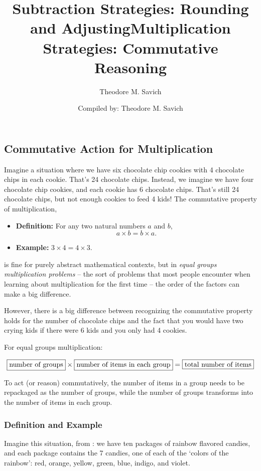 \documentclass[11pt]{article}
\title{Subtraction Strategies: Rounding and Adjusting}
\author{Theodore M. Savich}
\title{Multiplication Strategies: Commutative Reasoning}
\author{Compiled by: Theodore M. Savich}
\begin{document}
\maketitle
\subsection*{Commutative Action for Multiplication}

Imagine a situation where we have six chocolate chip cookies with 4 chocolate chips in each cookie. That's 24 chocolate chips. Instead, we imagine we have four chocolate chip cookies, and each cookie has 6 chocolate chips. That's still 24 chocolate chips, but not enough cookies to feed 4 kids! The commutative property of multiplication,
\begin{itemize}
    \item \textbf{Definition:} For any two natural numbers \( a \) and \( b \), 
    \[
    a \times b = b \times a.
    \]
    \item \textbf{Example:} \( 3 \times 4 = 4 \times 3 \).
\end{itemize}
is fine for purely abstract mathematical contexts, but in \textit{equal groups multiplication problems} -- the sort of problems that most people encounter when learning about multiplication for the first time -- the order of the factors can make a big difference.

However, there is a big difference between recognizing the commutative property holds for the number of chocolate chips and the fact that you would have two crying kids if there were 6 kids and you only had 4 cookies. 


For equal groups multiplication: 

\begin{equation*}
    \fbox{\text{number of groups}} \times \fbox{\text{number of items in each group}} = \fbox{\text{total number of items}}
\end{equation*}

To act (or reason) commutatively, the number of items in a group needs to be repackaged as the number of groups, while the number of groups transforms into the number of items in each group.


\subsubsection*{Definition and Example}
Imagine this situation, from \textcite{HackenbergCourseNotes}: we have ten packages of rainbow flavored candies, and each package contains the 7 candies, one of each of the `colors of the rainbow': red, orange, yellow, green, blue, indigo, and violet. 
\end{document}
